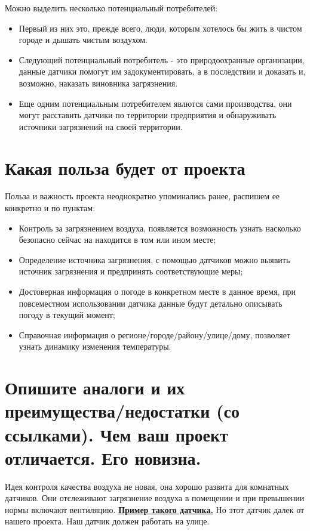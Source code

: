 \documentclass[a4paper,14pt]{article}
\begin{document}
Можно выделить несколько потенциальный потребителей:

\begin{itemize}
	\item Первый из них это, прежде всего, люди, которым хотелось бы жить в чистом городе и дышать чистым воздухом. 
	
	\item Следующий потенциальный потребитель - это природоохранные организации, данные датчики помогут им задокументировать, а в последствии и доказать и, возможно, наказать виновника загрязнения.
	
	\item Еще одним потенциальным потребителем явлются сами производства, они могут расставить датчики по территории предприятия и обнаруживать источники загрязнений на своей территории.
\end{itemize}

\section{ Какая польза будет от проекта}

Польза и важность проекта неоднократно упоминались ранее, распишем ее конкретно и по пунктам:

\begin{itemize}
	\item Контроль за загрязнением воздуха, появляется возможность узнать насколько безопасно сейчас на находится в том или ином месте;
	\item Определение источника загрязнения, с помощью датчиков можно выявить источник загрязнения и предпринять соответствующие меры;
	\item Достоверная информация о погоде в конкретном месте в данное время, при повсеместном использовании датчика данные будут детально описывать погоду в текущий момент;
	\item Справочная информация о регионе/городе/району/улице/дому, позволяет узнать динамику изменения температуры.
\end{itemize}

\section{ Опишите аналоги и их преимущества/недостатки (со ссылками). Чем ваш проект отличается. Его новизна.}

Идея контроля качества воздуха не новая, она хорошо развита для комнатных датчиков. Они отслеживают загрязнение воздуха в помещении и при превышении нормы включают вентиляцию.
\href{https://ventnaz.ru/datchik-kachestva-vozduha-sqa.php?ymclid=15913734219417796388300001}{\textbf{Пример такого датчика.}}
Но этот датчик далек от нашего проекта. Наш датчик должен работать на улице.
\end{document}
